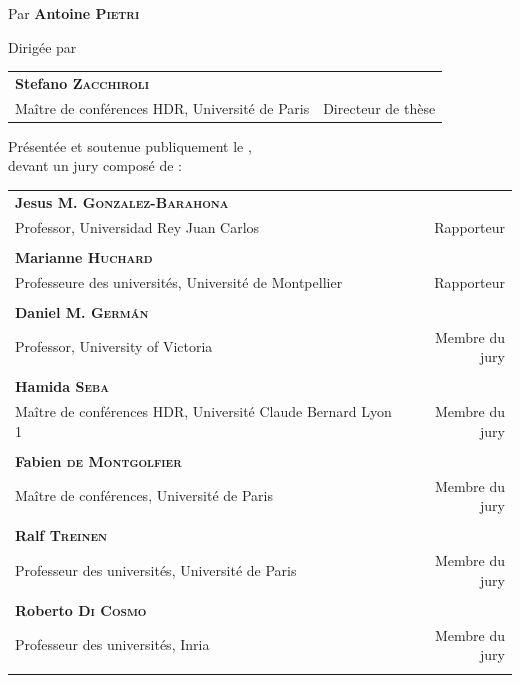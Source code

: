 \begin{titlingpage}
\begin{SingleSpace}
\begin{center}
{\LARGE Par } {\LARGE\textbf{Antoine \textsc{Pietri}}}\\

\vspace{5mm}

{\large Dirigée par }\\

\vspace{3mm}

\begin{tabular}{lr}
  \textbf{Stefano {\scshape Zacchiroli}} & \\
  Maître de conférences HDR, Université de Paris \hspace{25mm} &
  Directeur de thèse \\
\end{tabular}

\vspace{4mm}

{\large Présentée et soutenue publiquement le , \\
 devant un jury composé de :}\\

\vspace{4mm}

\begin{tabular}{lr}
  \textbf{Jesus M. {\scshape Gonzalez-Barahona}} & \\
  Professor, Universidad Rey Juan Carlos \hspace{45mm}
  & Rapporteur \\
  & \\
  \textbf{Marianne {\scshape Huchard}} & \\
  Professeure des universités, Université de Montpellier
  & Rapporteur \\
  & \\
  \textbf{Daniel M. {\scshape Germán}} & \\
  Professor, University of Victoria
  & Membre du jury \\
  & \\
  \textbf{Hamida {\scshape Seba}} & \\
  Maître de conférences HDR, Université Claude Bernard Lyon 1
  & Membre du jury \\
  & \\
  \textbf{Fabien {\scshape de Montgolfier}} & \\
  Maître de conférences, Université de Paris
  & Membre du jury \\
  & \\
  \textbf{Ralf {\scshape Treinen}} & \\
  Professeur des universités, Université de Paris
  & Membre du jury \\
  & \\
  \textbf{Roberto {\scshape Di Cosmo}} & \\
  Professeur des universités, Inria
  & Membre du jury \\
  & \\
\end{tabular}


\end{center}
\end{SingleSpace}
\end{titlingpage}
